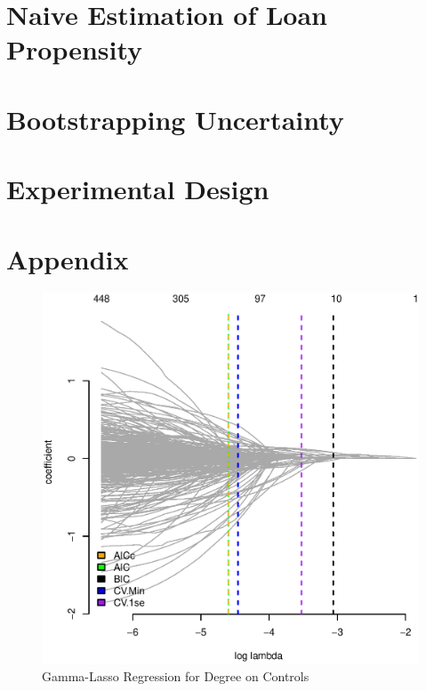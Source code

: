 \documentclass[11pt, fleqn]{article}
\begin{document}



\section{Naive Estimation of Loan Propensity}

\section{Bootstrapping Uncertainty}

\section{Experimental Design}

\section{Appendix}

\begin{figure}[!htb]
  \centering
  \includegraphics[scale=.5]{treat_aic.eps}
  \caption{Gamma-Lasso Regression for Degree on Controls}
  \label{fig:treat_aic}
\end{figure}


\end{document}
